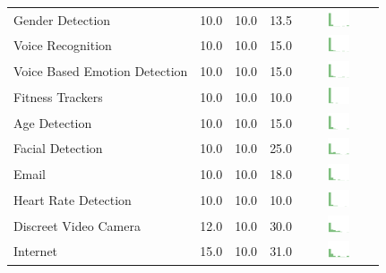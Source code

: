 \begin{table}[t]
\begin{center}
\begin{tabular}{| p{2cm} | p{1cm} | p{1cm} | p{1cm} | c |}
Gender Detection & 10.0 & 10.0 & 13.5 & \includegraphics[width = 2cm, height = 0.5cm]{tables/genderdetectionrisk} \\ 
Voice Recognition & 10.0 & 10.0 & 15.0 & \includegraphics[width = 2cm, height = 0.5cm]{tables/voicerecognitionrisk} \\ 
Voice Based Emotion Detection & 10.0 & 10.0 & 15.0 & \includegraphics[width = 2cm, height = 0.5cm]{tables/voicebasedemotiondetectionrisk} \\ 
Fitness Trackers & 10.0 & 10.0 & 10.0 & \includegraphics[width = 2cm, height = 0.5cm]{tables/fitnesstrackersrisk} \\ 
Age Detection & 10.0 & 10.0 & 15.0 & \includegraphics[width = 2cm, height = 0.5cm]{tables/agedetectionrisk} \\ 
Facial Detection & 10.0 & 10.0 & 25.0 & \includegraphics[width = 2cm, height = 0.5cm]{tables/facialdetectionrisk} \\ 
Email & 10.0 & 10.0 & 18.0 & \includegraphics[width = 2cm, height = 0.5cm]{tables/emailrisk} \\ 
Heart Rate Detection & 10.0 & 10.0 & 10.0 & \includegraphics[width = 2cm, height = 0.5cm]{tables/heartratedetectionrisk} \\ 
Discreet Video Camera & 12.0 & 10.0 & 30.0 & \includegraphics[width = 2cm, height = 0.5cm]{tables/discreetvideocamerarisk} \\ 
Internet & 15.0 & 10.0 & 31.0 & \includegraphics[width = 2cm, height = 0.5cm]{tables/internetrisk} \\ 

\end{tabular}
\end{center}
\end{table}
